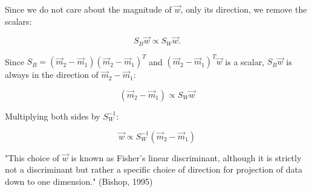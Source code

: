 \documentclass[12pt]{article}
\begin{document}
	Since we do not care about the magnitude of $\vec{w}$, only its direction, we remove the scalars:
	
	$$S_{B} \vec{w} \propto S_{W} \vec{w}.$$
	
	Since $S_B = (\vec{m}_2 - \vec{m}_1)(\vec{m}_2 - \vec{m}_1)^T$ and $(\vec{m}_2 - \vec{m}_1)^T \vec{w}$ is a scalar, $S_B \vec{w}$ is always in the direction of $\vec{m}_2-\vec{m}_1$:
	
	$$(\vec{m}_2 - \vec{m}_1)\propto S_{W} \vec{w}$$
	
	Multiplying both sides by $S_W^{-1}$:
	
	$$\vec{w} \propto S_{W}^{-1}(\vec{m}_2 - \vec{m}_1)$$
	
	"This choice of $\vec{w}$ is known as Fisher’s linear discriminant, although it is strictly not a discriminant but rather a specific choice of direction for projection of data down to one dimension." (Bishop, 1995)
	
	
	
	
	
	
	
	
	
	
	
	
	
	
	
	
	
	
	
	
	
	
	
	
	
	
	
	
	
	
	
	
	
	
	
	
	
\end{document}
